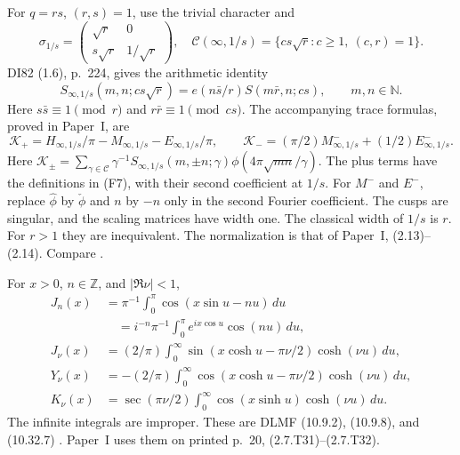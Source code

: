 \begin{fact}\label{fact:mixed-cusps}
For $q=rs$, $(r,s)=1$, use the trivial character and
\[
 \sigma_{1/s}=\begin{pmatrix}\sqrt r&0\\s\sqrt r&1/\sqrt r\end{pmatrix},
 \quad\mathcal C(\infty,1/s)=\{cs\sqrt r:c\ge1,\ (c,r)=1\}.
\]
DI82 (1.6), p.~224, gives the arithmetic identity
\cite[(1.6), p.~224]{DI82}
\[
 S_{\infty,1/s}(m,n;cs\sqrt r)
       =e(n\bar s/r)S(m\bar r,n;cs),\qquad m,n\in\mathbb N.
\]
Here $s\bar s\equiv1\pmod r$ and $r\bar r\equiv1\pmod{cs}$.
The accompanying trace formulas, proved in Paper~I, are
\[
 \mathcal K_+=H_{\infty,1/s}/\pi-M_{\infty,1/s}-E_{\infty,1/s}/\pi,
 \qquad
 \mathcal K_-=(\pi/2)M^-_{\infty,1/s}+(1/2)E^-_{\infty,1/s}.
\]
Here $\mathcal K_\pm=\sum_{\gamma\in\mathcal C}\gamma^{-1}
S_{\infty,1/s}(m,\pm n;\gamma)\phi(4\pi\sqrt{mn}/\gamma)$.
The plus terms have the definitions in (F7), with their second
coefficient at $1/s$.
For $M^-$ and $E^-$, replace $\widehat\phi$ by $\check\phi$ and $n$ by $-n$
only in the second Fourier coefficient.
The cusps are singular, and the scaling matrices have width one.
The classical width of $1/s$ is $r$.
For $r>1$ they are inequivalent.
The normalization is that of Paper~I, (2.13)--(2.14). Compare
\cite[Lemmas~4.3, 4.5, (4.7)--(4.19)]{Drappeau2017}
\cite[(2.13)--(2.14), p.~8]{PaperI}.
\end{fact}

\begin{fact}\label{fact:F9-dlmf}\label{fact:F7-dlmf}
For $x>0$, $n\in\mathbb Z$, and $|\Re\nu|<1$,
\begin{align*}
 J_n(x)&=\pi^{-1}\int_0^\pi\cos(x\sin u-nu)\,du\\
       &\quad=i^{-n}\pi^{-1}\int_0^\pi e^{ix\cos u}\cos(nu)\,du,\\
 J_\nu(x)&=(2/\pi)\int_0^\infty
       \sin(x\cosh u-\pi\nu/2)\cosh(\nu u)\,du,\\
 Y_\nu(x)&=-(2/\pi)\int_0^\infty
       \cos(x\cosh u-\pi\nu/2)\cosh(\nu u)\,du,\\
 K_\nu(x)&=\sec(\pi\nu/2)\int_0^\infty
       \cos(x\sinh u)\cosh(\nu u)\,du.
\end{align*}
The infinite integrals are improper.
These are DLMF (10.9.2), (10.9.8), and (10.32.7)
\cite[(10.9.2), (10.9.8), (10.32.7)]{DLMF}.
Paper~I uses them on printed p.~20, (2.7.T31)--(2.7.T32).
\end{fact}

